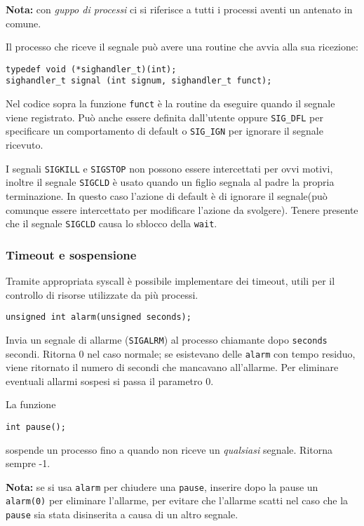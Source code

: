 \documentclass[a4paper, 10pt]{article}
\begin{document}
\textbf{Nota:} con \textit{guppo di processi} ci si riferisce a tutti i processi aventi un antenato in comune.

Il processo che riceve il segnale può avere una routine che avvia alla sua ricezione:
\begin{verbatim}
typedef void (*sighandler_t)(int);
sighandler_t signal (int signum, sighandler_t funct);
\end{verbatim}
Nel codice sopra la funzione \verb|funct| è la routine da eseguire quando il segnale viene registrato. Può anche essere definita dall'utente oppure \verb|SIG_DFL| per specificare un comportamento di default o \verb|SIG_IGN| per ignorare il segnale ricevuto.



I segnali \verb|SIGKILL| e \verb|SIGSTOP| non possono essere intercettati per ovvi motivi, inoltre il segnale \verb|SIGCLD| è usato quando un figlio segnala al padre la propria terminazione. In questo caso l'azione di default è di ignorare il segnale(può comunque essere intercettato per modificare l'azione da svolgere). Tenere presente che il segnale \verb|SIGCLD| causa lo sblocco della \verb|wait|.

\subsubsection{Timeout e sospensione}
Tramite appropriata syscall è possibile implementare dei timeout, utili per il controllo di risorse utilizzate da più processi.
\begin{verbatim}
unsigned int alarm(unsigned seconds);
\end{verbatim}
Invia un segnale di allarme (\verb|SIGALRM|) al processo chiamante dopo \verb|seconds| secondi. Ritorna 0 nel caso normale; se esistevano delle \verb|alarm| con tempo residuo, viene ritornato il numero di secondi che mancavano all'allarme.
Per eliminare eventuali allarmi sospesi si passa il parametro 0.

La funzione 
\begin{verbatim}
int pause();
\end{verbatim}
sospende un processo fino a quando non riceve un \textit{qualsiasi} segnale. Ritorna sempre -1.

\textbf{Nota:} se si usa \verb|alarm| per chiudere una \verb|pause|, inserire dopo la pause un \verb|alarm(0)| per eliminare l'allarme, per evitare che l'allarme scatti nel caso che la \verb|pause| sia stata disinserita a causa di un altro segnale.
\end{document}
